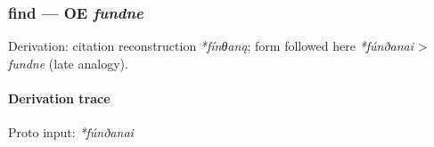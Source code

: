 \documentclass[
  british,
  a4paper,
]{article}
\begin{document}
\subsubsection{\texorpdfstring{find --- OE
\emph{fundne}}{find --- OE fundne}}\label{find-oe-fundne}

Derivation: citation reconstruction \emph{*fínθaną}; form followed here
\emph{*fúnðanai} \textgreater{} \emph{fundne} (late analogy).

\paragraph{Derivation trace}\label{derivation-trace-152}

Proto input: \emph{*fúnðanai}

\begingroup
\setlength{\fboxsep}{6pt}
\end{document}
